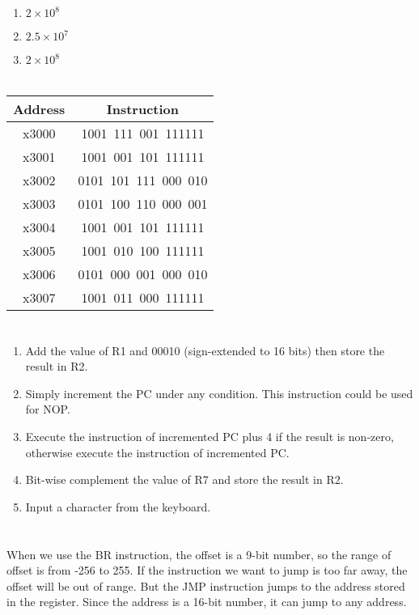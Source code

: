 \documentclass[UTF8]{ctexart}
\begin{document}
\section{}  %

\section{}  %
\begin{enumerate}
  \item $2\times 10^8$
  \item $2.5 \times 10^7$
  \item $2 \times 10^8$
\end{enumerate}
\section{}  %
\begin{table}[H]
  \centering
  \begin{tabular}{cc}
    \hline\hline
    Address & Instruction \\
    \hline
    x3000 & 1001\ 111\ 001\ 111111 \\
    x3001 & 1001\ 001\ 101\ 111111 \\
    x3002 & 0101\ 101\ 111\ 000\ 010 \\
    x3003 & 0101\ 100\ 110\ 000\ 001 \\
    x3004 & 1001\ 001\ 101\ 111111 \\
    x3005 & 1001\ 010\ 100\ 111111 \\
    x3006 & 0101\ 000\ 001\ 000\ 010 \\
    x3007 & 1001\ 011\ 000\ 111111 \\
    \hline\hline
  \end{tabular}
\end{table}
\section{}  %
\begin{enumerate}
  \item Add the value of R1 and 00010 (sign-extended to 16 bits) then store the result in R2.
  \item Simply increment the PC under any condition. This instruction could be used for NOP.
  \item Execute the instruction of incremented PC plus 4 if the result is non-zero, otherwise execute the instruction of incremented PC.
  \item Bit-wise complement the value of R7 and store the result in R2.
  \item Input a character from the keyboard.
\end{enumerate}
\section{}  %
When we use the BR instruction, the offset is a 9-bit number, 
so the range of offset is from -256 to 255. 
If the instruction we want to jump is too far away, the offset will be out of range.
But the JMP instruction jumps to the address stored in the register.
Since the address is a 16-bit number, it can jump to any address.
\end{document}
